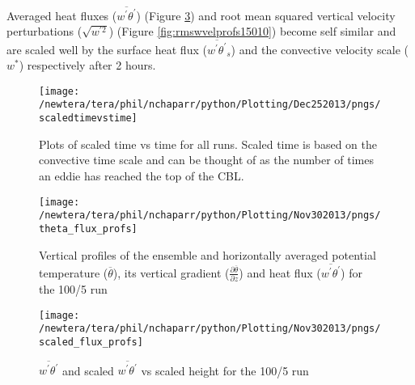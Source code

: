 Averaged heat fluxes ($\overline{w^{'}\theta^{'}}$) (Figure \ref{fig:scaledfluxprofs15010}) and 
root mean squared vertical velocity perturbations ($\sqrt{w^{'2}}$) (Figure \ref{fig:rmswvelprofs15010})
become self similar and are scaled well by the surface heat flux ($\overline{w^{'}\theta^{'}}_{s}$) 
and the convective velocity scale ($w^{*}$) respectively after 2 hours.\\

\begin{figure}[!h]
    \centering
    \texttt{[image: /newtera/tera/phil/nchaparr/python/Plotting/Dec252013/pngs/scaledtimevstime]}
    \caption{Plots of scaled time vs time for all runs.  Scaled time is based on the convective time scale 
    and can be thought of as the number of times an eddie has reached the top of the CBL. }
    \label{fig:ScaledTimevsTime}   
\end{figure}

\begin{figure}[htbp]
    \centering
    \texttt{[image: /newtera/tera/phil/nchaparr/python/Plotting/Nov302013/pngs/theta\_flux\_profs]}
    \caption{Vertical profiles of the ensemble and horizontally averaged potential temperature ($\overline{\theta}$), its vertical gradient ($\frac{\partial \overline{\theta}}{\partial z}$)  
     and heat flux ($\overline{w^{'}\theta^{'}}$) for the 100/5 run}
    \label{fig:tempgradfluxprofs1005}   %
\end{figure}

\begin{figure}[htbp]
    \centering
    \texttt{[image: /newtera/tera/phil/nchaparr/python/Plotting/Nov302013/pngs/scaled\_flux\_profs]}
    \caption{$\overline{w^{'}\theta^{'}}$ and scaled $\overline{w^{'}\theta^{'}}$  vs scaled height for the 100/5 run}
    \label{fig:scaledfluxprofs15010}   %
\end{figure}


